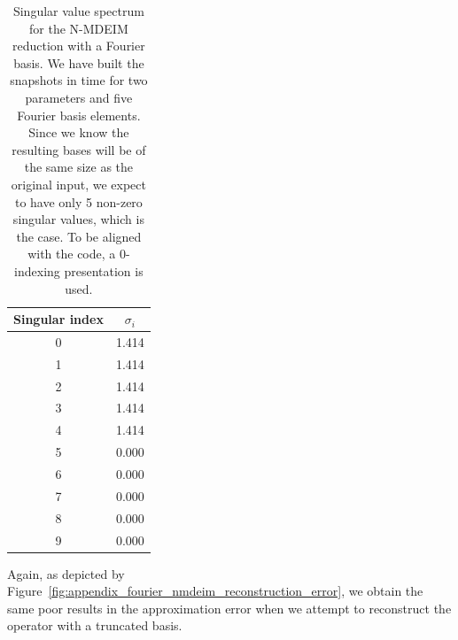 \documentclass[../../thesis.tex]{subfiles}
\begin{document}
\begin{table}[h]
    \centering
    \caption{Singular value spectrum for the N-MDEIM reduction with a Fourier basis.
    We have built the snapshots in time for two parameters and five Fourier basis elements.
    Since we know the resulting bases will be of the same size as the original input,
    we expect to have only 5 non-zero singular values, which is the case.
    To be aligned with the code, a 0-indexing presentation is used.}
    \begin{tabular}{cc}
        \toprule
        Singular index & $\sigma_i$ \\
        \midrule
        0 &  1.414 \\
        1 &  1.414 \\
        2 &  1.414 \\
        3 &  1.414 \\
        4 &  1.414 \\
        5 &  0.000 \\
        6 &  0.000 \\
        7 &  0.000 \\
        8 &  0.000 \\
        9 &  0.000 \\
        \bottomrule
    \end{tabular}
    \label{tab:ndeim_with_fourier_modes}
\end{table}
Again, as depicted by Figure~\ref{fig:appendix_fourier_nmdeim_reconstruction_error},
we obtain the same poor results in the approximation error when
we attempt to reconstruct the operator with a truncated basis. 
\end{document}

